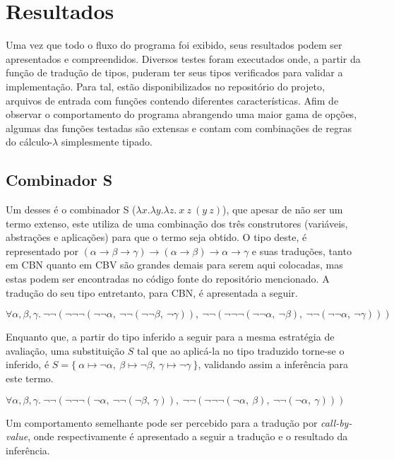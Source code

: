 \chapter{Resultados}\label{ch:resultados}
Uma vez que todo o fluxo do programa foi exibido, seus resultados podem ser apresentados e compreendidos.
Diversos testes foram executados onde, a partir da função de tradução de tipos, puderam ter seus tipos verificados para validar a implementação.
Para tal, estão disponibilizados no repositório do projeto, arquivos de entrada com funções contendo diferentes características.
Afim de observar o comportamento do programa abrangendo uma maior gama de opções, algumas das funções testadas são extensas e contam com combinações de regras do cálculo-$\lambda$ simplesmente tipado.

\section{Combinador S}
Um desses é o combinador S ($\lambda x.\lambda y.\lambda z.\ x\ z\ (y\ z)$), que apesar de não ser um termo extenso, este utiliza de uma combinação dos três construtores (variáveis, abstrações e aplicações) para que o termo seja obtido.
O tipo deste, é representado por $(\alpha \to \beta \to \gamma) \to (\alpha \to \beta) \to \alpha \to \gamma$ e suas traduções, tanto em CBN quanto em CBV são grandes demais para serem aqui colocadas, mas estas podem ser encontradas no código fonte do repositório mencionado.
A tradução do seu tipo entretanto, para CBN, é apresentada a seguir.
\lstset{extendedchars=false, escapeinside=''}
\begin{center}
  $\forall\alpha,\beta,\gamma.\ \neg\neg(\neg\neg\neg(\neg\neg\alpha,\ \neg\neg(\neg\neg\beta,\ \neg\gamma)),\ \neg\neg(\neg\neg\neg(\neg\neg\alpha,\ \neg\beta),\ \neg\neg(\neg\neg\alpha,\ \neg\gamma)))$
\end{center}
Enquanto que, a partir do tipo inferido a seguir para a mesma estratégia de avaliação, uma substituição $S$ tal que ao aplicá-la no tipo traduzido torne-se o inferido, é $S = \{\ \alpha \mapsto \neg\alpha,\ \beta \mapsto \neg\beta,\ \gamma \mapsto \neg\gamma\ \}$, validando assim a inferência para este termo.
\lstset{extendedchars=false, escapeinside=''}
\begin{center}
  $\forall\alpha,\beta,\gamma.\ \neg\neg(\neg\neg\neg(\neg\alpha,\ \neg\neg(\neg\beta,\ \gamma)),\ \neg\neg(\neg\neg\neg(\neg\alpha,\ \beta),\ \neg\neg(\neg\alpha,\ \gamma)))$
\end{center}
Um comportamento semelhante pode ser percebido para a tradução por \textit{call-by-value}, onde respectivamente é apresentado a seguir a tradução e o resultado da inferência.
